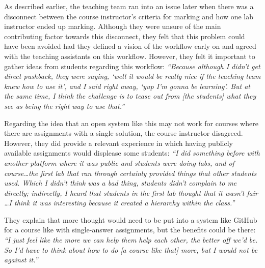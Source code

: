 As described earlier, the teaching team ran into an issue later when there was a disconnect between the course instructor's criteria for marking and how one lab instructor ended up marking. Although they were unsure of the main contributing factor towards this disconnect, they felt that this problem could have been avoided had they defined a vision of the workflow early on and agreed with the teaching assistants on this workflow. However, they felt it important to gather ideas from students regarding this workflow: \textit{``Because although I didn't get direct pushback, they were saying, `well it would be really nice if the teaching team knew how to use it', and I said right away, `yup I'm gonna be learning'. But at the same time, I think the challenge is to tease out from [the students] what they see as being the right way to use that.''}


Regarding the idea that an open system like this may not work for courses where there are assignments with a single solution, the course instructor disagreed. However, they did provide a relevant experience in which having publicly available assignments would displease some students: \textit{``I did something before with another platform where it was public and students were doing labs, and of course\ldots the first lab that ran through certainly provided things that other students used. Which I didn't think was a bad thing, students didn't complain to me directly; indirectly, I heard that students in the first lab thought that it wasn't fair \ldots I think it was interesting because it created a hierarchy within the class.''}

They explain that more thought would need to be put into a system like GitHub for a course like with single-answer assignments, but the benefits could be there: \textit{``I just feel like the more we can help them help each other, the better off we'd be. So I'd have to think about how to do [a course like that] more, but I would not be against it.''}

